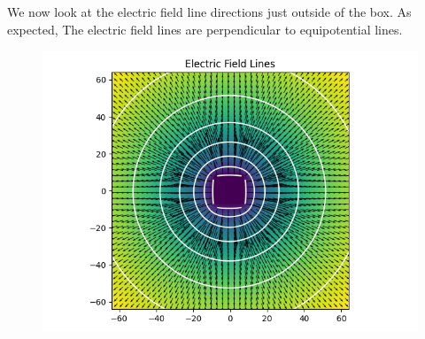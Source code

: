 \documentclass[]{article}
\begin{document}
We now look at the electric field line directions just outside of the box. As expected, The electric field lines are perpendicular to equipotential lines.

\begin{figure}[h!]
	\centering
	\includegraphics[width=0.45\linewidth]{../Results/2c3.png}
\end{figure}
\end{document}
